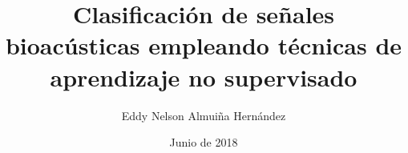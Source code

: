 \title{Clasificación de señales bioacústicas empleando técnicas de aprendizaje no supervisado}

\author{Eddy Nelson Almuiña Hernández}


\date{Junio de 2018}

